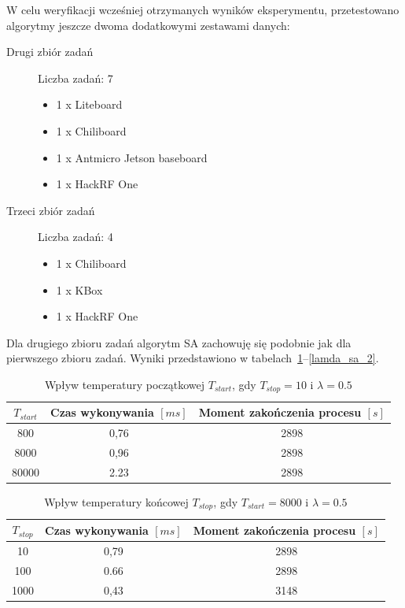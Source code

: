 \breakparagraph{}
W celu weryfikacji wcześniej otrzymanych wyników eksperymentu, przetestowano algorytmy jeszcze dwoma dodatkowymi zestawami danych:
\begin{description}
	\item[Drugi zbiór zadań] Liczba zadań: 7
	\begin{itemize}
		\item 1 x Liteboard
		\item 1 x Chiliboard
		\item 1 x Antmicro Jetson baseboard
		\item 1 x HackRF One
	\end{itemize}
	\item[Trzeci zbiór zadań] Liczba zadań: 4
	\begin{itemize}
		\item 1 x Chiliboard
		\item 1 x KBox
		\item 1 x HackRF One
	\end{itemize}
\end{description}

Dla drugiego zbioru zadań algorytm SA zachowuję się podobnie jak dla pierwszego zbioru zadań. Wyniki przedstawiono w tabelach~\ref{tstart_sa_2}--\ref{lamda_sa_2}.

\begin{table}[H]
	\centering
	\label{tstart_sa_2}
	\caption{Wpływ temperatury początkowej $T_{start}$, gdy $T_{stop}=10$ i $\lambda=0.5$}
	\begin{tabular}{ccc}
		\toprule
		$T_{start}$ & Czas wykonywania $[ms]$ & Moment zakończenia procesu $[s]$ \\
		\midrule
		800         & 0,76                    & 2898                              \\
		8000        & 0,96                    & 2898                              \\
		80000       & 2.23                    & 2898                              \\
		\bottomrule
	\end{tabular}
\end{table}

\begin{table}[H]
	\centering
	\label{tstop_sa_2}
	\caption{Wpływ temperatury końcowej $T_{stop}$, gdy $T_{start}=8000$ i $\lambda=0.5$}
	\begin{tabular}{ccc}
		\toprule
		$T_{stop}$ & Czas wykonywania $[ms]$ & Moment zakończenia procesu $[s]$ \\
		\midrule
		10         & 0,79                    & 2898                              \\
		100        & 0.66                    & 2898                              \\
		1000       & 0,43                    & 3148                              \\
		\bottomrule
	\end{tabular}
\end{table}

